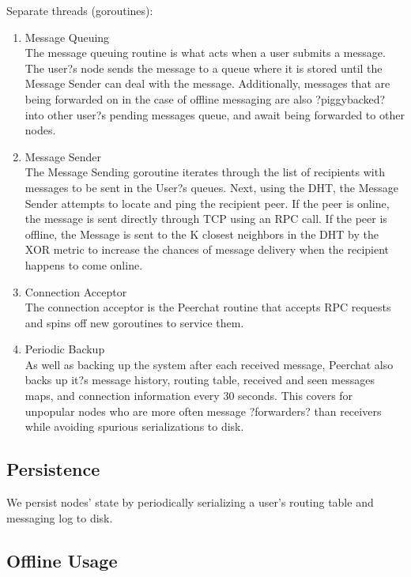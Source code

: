\documentclass{article}
\begin{document}
Separate threads (goroutines):
\begin{enumerate}
	\item Message Queuing \\
	The message queuing routine is what acts when a user submits a message. The user?s node sends the message to a queue where it is stored until the Message Sender can deal with the message. Additionally, messages that are being forwarded on in the case of offline messaging are also ?piggybacked? into other user?s pending messages queue, and await being forwarded to other nodes. 

	\item Message Sender \\
	The Message Sending goroutine iterates through the list of recipients with messages to be sent in the User?s queues.  Next, using the DHT, the Message Sender attempts to locate and ping the recipient peer. If the peer is online, the message is sent directly through TCP using an RPC call. If the peer is offline, the Message is sent to the K closest neighbors in the DHT by the XOR metric to increase the chances of message delivery when the recipient happens to come online. 

	\item Connection Acceptor \\
The connection acceptor is the Peerchat routine that accepts RPC requests and spins off new goroutines to service them. 

	\item Periodic Backup \\
	As well as backing up the system after each received message, Peerchat also backs up it?s message history, routing table, received and seen messages maps, and connection information every 30 seconds. This covers for unpopular nodes who are more often message ?forwarders? than receivers while avoiding spurious serializations to disk. 
\end{enumerate}

\subsection{Persistence}

We persist nodes' state by periodically serializing a user's routing table and messaging log to disk. 

\subsection{Offline Usage}
\end{document}
